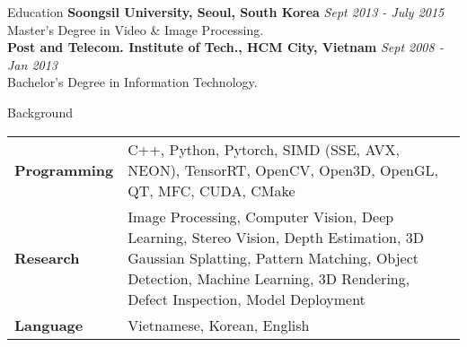 \documentclass{resume}
\begin{document}
	\begin{rSection}{Education}
		{\bf Soongsil University, Seoul, South Korea} \hfill {\em Sept 2013 - July 2015} \\  {Master's Degree in Video \& Image Processing.} \smallskip \\
		{\bf Post and Telecom. Institute of Tech., HCM City, Vietnam} \hfill {\em Sept 2008 - Jan 2013} \\  {Bachelor's Degree in Information Technology.}
	\end{rSection}

	\begin{rSection}{Background}
		\begin{tabular} {p{0.2\linewidth} p{0.8\linewidth}}
			\bf Programming & C++,  Python,  Pytorch, SIMD (SSE, AVX, NEON), TensorRT, OpenCV, Open3D, OpenGL, QT, MFC, CUDA, CMake \\
			\bf Research & Image Processing, Computer Vision,  Deep Learning,  Stereo Vision, Depth Estimation, 3D Gaussian Splatting, Pattern Matching, Object Detection, Machine Learning, 3D Rendering, Defect Inspection, Model Deployment \\
			\bf Language & Vietnamese, Korean, English
		\end{tabular}
		
	\end{rSection}
\end{document}
